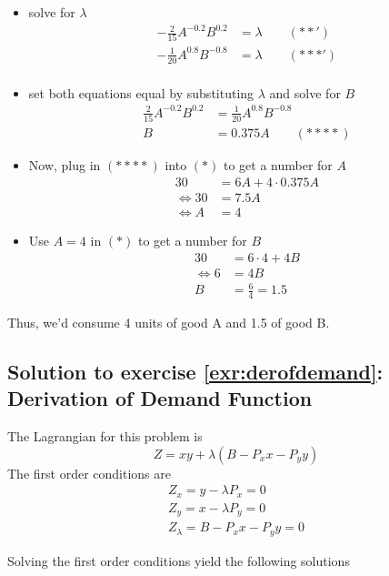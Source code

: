 \documentclass[
  12pt,
  oneside]{book}
\providecommand{\tightlist}{%
  \setlength{\itemsep}{0pt}\setlength{\parskip}{0pt}}
\theoremstyle{definition}
\theoremstyle{definition}
\theoremstyle{definition}
\theoremstyle{definition}
\theoremstyle{remark}
\begin{document}
\begin{itemize}
\tightlist
\item
  solve for \(\lambda\)
  \begin{align*}
    -\frac{2}{15} A^{-0.2}B^{0.2}&=\lambda \qquad (**')\\
        -\frac{1}{20} A^{0.8}B^{-0.8}&=\lambda \qquad (***')\\
  \end{align*}
\item
  set both equations equal by substituting \(\lambda\) and solve for \(B\)
  \begin{align*}
    \frac{2}{15} A^{-0.2}B^{0.2}&=  \frac{1}{20} A^{0.8}B^{-0.8}\\
    B&=0.375A \qquad (****) %
  \end{align*}
\item
  Now, plug in \((****)\) into \((*)\) to get a number for \(A\)
  \begin{align*}
    30&=6A+4\cdot 0.375 A\\
    \Leftrightarrow 30&=7.5A\\
    \Leftrightarrow A&=4
  \end{align*}
\item
  Use \(A=4\) in \((*)\) to get a number for \(B\)
  \begin{align*}
    30&=6\cdot 4+4 B\\
    \Leftrightarrow 6&=4B\\
    B&=\frac{6}{4}=1.5
  \end{align*}
\end{itemize}

Thus, we'd consume 4 units of good A and 1.5 of good B.

\hypertarget{sol:derofdemand}{%
\subsection*{Solution to exercise \ref{exr:derofdemand}: Derivation of Demand Function}\label{sol:derofdemand}}

The Lagrangian for this problem is
\[
  Z=x y+\lambda\left(B-P_{x} x-P_{y} y\right)
\]
The first order conditions are
\[
\begin{array}{l}
Z_{x}=y-\lambda P_{x}=0 \\
Z_{y}=x-\lambda P_{y}=0 \\
Z_{\lambda}=B-P_{x} x-P_{y} y=0
\end{array}
\]

Solving the first order conditions yield the following solutions
\end{document}
